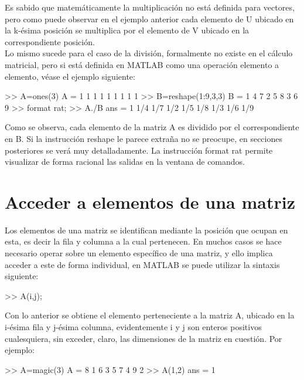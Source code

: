 Es sabido que matemáticamente la multiplicación no está definida para
vectores, pero como puede observar en el ejemplo anterior cada elemento
de U ubicado en la k-ésima posición se multiplica por el elemento de V
ubicado en la correspondiente posición. \\

Lo mismo sucede para el caso de la división, formalmente no existe en el
cálculo matricial, pero si está definida en MATLAB como una operación
elemento a elemento, véase el ejemplo siguiente:

\begin{matlab}
>> A=ones(3)
A =
     1     1     1
     1     1     1
     1     1     1
>> B=reshape(1:9,3,3)
B =
     1     4     7
     2     5     8
     3     6     9
>> format rat;
>> A./B
ans =
       1              1/4            1/7     
       1/2            1/5            1/8     
       1/3            1/6            1/9    
 
\end{matlab}

Como se observa, cada elemento de la matriz A es dividido por el
correspondiente en B. Si la instrucción reshape le parece extraña no se
preocupe, en secciones posteriores se verá muy detalladamente. La
instrucción format rat permite visualizar de forma racional las salidas
en la ventana de comandos.

\section{Acceder a elementos de una matriz}\label{acceder-a-elementos-de-una-matriz}

Los elementos de una matriz se identifican mediante la posición que
ocupan en esta, es decir la fila y columna a la cual pertenecen. En
muchos casos se hace necesario operar sobre un elemento específico de
una matriz, y ello implica acceder a este de forma individual, en MATLAB
se puede utilizar la sintaxis siguiente:

\begin{matlab}
>> A(i,j);
\end{matlab}

Con lo anterior se obtiene el elemento perteneciente a la matriz A,
ubicado en la i-ésima fila y j-ésima columna, evidentemente i y j son
enteros positivos cualesquiera, sin exceder, claro, las dimensiones de
la matriz en cuestión. Por ejemplo:

\begin{matlab}
>> A=magic(3)
A =
     8     1     6
     3     5     7
     4     9     2
>> A(1,2)
ans =
     1
\end{matlab}

